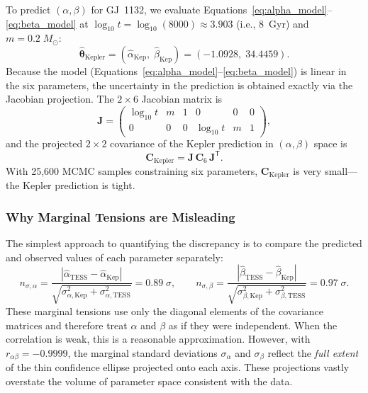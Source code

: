 To predict $(\alpha, \beta)$ for GJ~1132, we evaluate
Equations~\ref{eq:alpha_model}--\ref{eq:beta_model} at $\log_{10} t =
\log_{10}(8000) \approx 3.903$ (i.e., 8~Gyr) and $m =
0.2\;M_\odot$:
\begin{equation}
\hat{\boldsymbol{\theta}}_{\mathrm{Kepler}} =
  (\hat{\alpha}_{\mathrm{Kep}},\; \hat{\beta}_{\mathrm{Kep}}) =
  (-1.0928,\; 34.4459).
\end{equation}
Because the model (Equations~\ref{eq:alpha_model}--\ref{eq:beta_model})
is linear in the six parameters, the uncertainty in the prediction is
obtained exactly via the Jacobian projection.  The $2 \times 6$
Jacobian matrix is
\begin{equation}
\mathbf{J} = \begin{pmatrix}
\log_{10} t & m & 1 & 0 & 0 & 0 \\
0 & 0 & 0 & \log_{10} t & m & 1
\end{pmatrix},
\label{eq:jacobian}
\end{equation}
and the projected $2 \times 2$ covariance of the Kepler prediction in
$(\alpha, \beta)$ space is
\begin{equation}
\mathbf{C}_{\mathrm{Kepler}} =
  \mathbf{J} \, \mathbf{C}_{6} \, \mathbf{J}^{\mathsf{T}}.
\label{eq:projected_cov}
\end{equation}
With 25{,}600 MCMC samples constraining six parameters,
$\mathbf{C}_{\mathrm{Kepler}}$ is very small---the Kepler prediction
is tight.

\subsubsection{Why Marginal Tensions are Misleading}

The simplest approach to quantifying the discrepancy is to compare the
predicted and observed values of each parameter separately:
\begin{equation}
n_{\sigma,\alpha} =
  \frac{|\hat{\alpha}_{\mathrm{TESS}} - \hat{\alpha}_{\mathrm{Kep}}|}
       {\sqrt{\sigma^2_{\alpha,\mathrm{Kep}} +
              \sigma^2_{\alpha,\mathrm{TESS}}}} = 0.89\;\sigma,
\qquad
n_{\sigma,\beta} =
  \frac{|\hat{\beta}_{\mathrm{TESS}} - \hat{\beta}_{\mathrm{Kep}}|}
       {\sqrt{\sigma^2_{\beta,\mathrm{Kep}} +
              \sigma^2_{\beta,\mathrm{TESS}}}} = 0.97\;\sigma.
\label{eq:marginal_tensions}
\end{equation}
These marginal tensions use only the diagonal elements of the
covariance matrices and therefore treat $\alpha$ and $\beta$ as if
they were independent.  When the correlation is weak, this is a
reasonable approximation.  However, with $r_{\alpha\beta} = -0.9999$,
the marginal standard deviations $\sigma_\alpha$ and $\sigma_\beta$
reflect the \emph{full extent} of the thin confidence ellipse
projected onto each axis.  These projections vastly overstate the
volume of parameter space consistent with the data.

